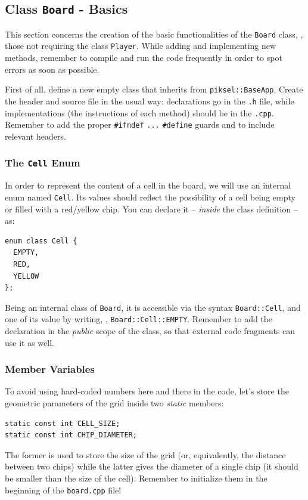 \documentclass{article}
\begin{document}
\subsection{Class \texttt{Board} - Basics}

This section concerns the creation of the basic functionalities of the \texttt{Board} class, \ie, those not requiring the class \texttt{Player}. While adding and implementing new methods, remember to compile and run the code frequently in order to spot errors as soon as possible.

First of all, define a new empty class that inherits from \texttt{piksel::BaseApp}. Create the header and source file in the usual way: declarations go in the \texttt{.h} file, while implementations (the instructions of each method) should be in the \texttt{.cpp}. Remember to add the proper \texttt{\#ifndef} \texttt{...} \texttt{\#define} guards and to include relevant headers.





\subsubsection{The \texttt{Cell} Enum}

In order to represent the content of a cell in the board, we will use an internal enum named \texttt{Cell}. Its values should reflect the possibility of a cell being empty or filled with a red/yellow chip. You can declare it -- \emph{inside} the class definition -- as:
\begin{lstlisting}[style=mycpp,numbers=none]
enum class Cell {
  EMPTY,
  RED,
  YELLOW
};
\end{lstlisting}

Being an internal class of \texttt{Board}, it is accessible via the syntax \texttt{Board::Cell}, and one of its value by writing, \eg, \texttt{Board::Cell::EMPTY}. Remember to add the declaration in the \emph{public} scope of the class, so that external code fragments can use it as well.

\subsubsection{Member Variables}

To avoid using hard-coded numbers here and there in the code, let's store the geometric parameters of the grid inside two \emph{static} members:
\begin{lstlisting}[style=mycpp,numbers=none]
static const int CELL_SIZE;
static const int CHIP_DIAMETER;
\end{lstlisting}
The former is used to store the size of the grid (or, equivalently, the distance between two chips) while the latter gives the diameter of a single chip (it should be smaller than the size of the cell). Remember to initialize them in the beginning of the \texttt{board.cpp} file!
\end{document}

